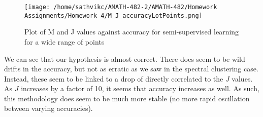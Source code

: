 \documentclass[11pt]{amsart}
\begin{document}
\begin{figure}[H]
    \centering
    \texttt{[image: /home/sathvikc/AMATH-482-2/AMATH-482/Homework Assignments/Homework 4/M\_J\_accuracyLotPoints.png]}
    \caption{Plot of M and J values against accuracy for semi-supervised learning for a wide range of points}
    \label{fig:M_J_accuracy}
\end{figure}

We can see that our hypothesis is almost correct. There does seem to be wild drifts in the accuracy, 
but not as erratic as we saw in the spectral clustering case. Instead, these seem to be linked to a drop of directly 
correlated to the $J$ values. As $J$ increases by a factor of 10, it seems that accuracy increases as well. As such, this 
methodology does seem to be much more stable (no more rapid oscillation between varying accuracies). 




\end{document}
